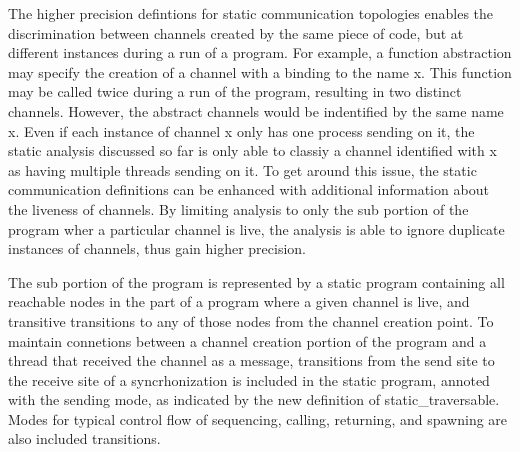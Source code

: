 \documentclass{article}
\begin{document}
The higher precision defintions for static communication topologies enables the discrimination
between channels created by the same piece of code, but at different instances during a run of
a program.  For example, a function abstraction may specify the creation of a channel with a
binding to the name x.  This function may be called twice during a run of the program,
resulting in two distinct channels.  However, the abstract channels would be indentified by the
same name x.  Even if each instance of channel x only has one process sending on it, the static
analysis discussed so far is only able to classiy a channel identified with x as having
multiple threads sending on it. To get around this issue, the static communication definitions
can be enhanced with additional information about the liveness of channels.  By limiting
analysis to only the sub portion of the program wher a particular channel is live, the analysis
is able to ignore duplicate instances of channels, thus gain higher precision. 

The sub portion of the program is represented by a static program containing all reachable nodes in the
part of a program where a given channel is live, and transitive transitions to any of those
nodes from the channel creation point.  To maintain connetions between a channel creation
portion of the program and a thread that received the channel as a message, transitions from
the send site to the receive site of a syncrhonization is included in the static program, annoted with
the sending mode, as indicated by the new definition of static\_traversable.  Modes for typical
control flow of sequencing, calling, returning, and spawning are also included transitions.
\end{document}
